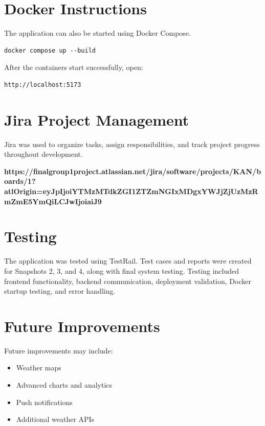 \documentclass[12pt]{article}
\begin{document}
\section{Docker Instructions}

The application can also be started using Docker Compose.

\begin{verbatim}
docker compose up --build
\end{verbatim}

After the containers start successfully, open:

\begin{verbatim}
http://localhost:5173
\end{verbatim}

\section{Jira Project Management}

Jira was used to organize tasks, assign responsibilities, and track project progress throughout development.

\textbf{https://finalgroup1project.atlassian.net/jira/software/projects/KAN/boards/1?atlOrigin=eyJpIjoiYTMzMTdkZGI1ZTZmNGIxMDgxYWJjZjUzMzRmZmE5YmQiLCJwIjoiaiJ9}

\section{Testing}

The application was tested using TestRail. Test cases and reports were created for Snapshots 2, 3, and 4, along with final system testing. Testing included frontend functionality, backend communication, deployment validation, Docker startup testing, and error handling.

\section{Future Improvements}

Future improvements may include:
\begin{itemize}
    \item Weather maps
    \item Advanced charts and analytics
    \item Push notifications
    \item Additional weather APIs
\end{itemize}
\end{document}
